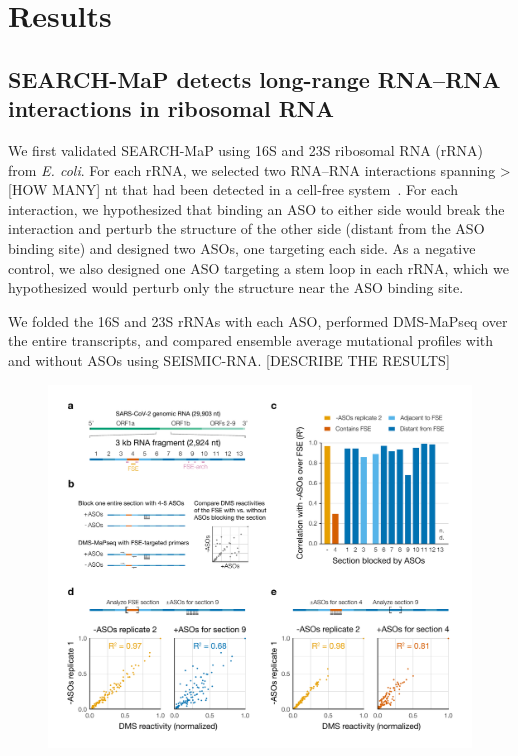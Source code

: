\documentclass[main.tex]{subfiles}
\begin{document}
\section{Results}
\label{results}







\subsection{SEARCH-MaP detects long-range RNA--RNA interactions in ribosomal RNA}

We first validated SEARCH-MaP using 16S and 23S ribosomal RNA (rRNA) from \textit{E. coli}.
For each rRNA, we selected two RNA--RNA interactions spanning > [HOW MANY] nt that had been detected in a cell-free system~\cite{Mustoe2019}.
For each interaction, we hypothesized that binding an ASO to either side would break the interaction and perturb the structure of the other side (distant from the ASO binding site) and designed two ASOs, one targeting each side.
As a negative control, we also designed one ASO targeting a stem loop in each rRNA, which we hypothesized would perturb only the structure near the ASO binding site.

We folded the 16S and 23S rRNAs with each ASO, performed DMS-MaPseq over the entire transcripts, and compared ensemble average mutational profiles with and without ASOs using SEISMIC-RNA.
[DESCRIBE THE RESULTS]

\begin{figure}[H]
	\includegraphics[height=0.95\textheight]{../MainFigures/fig2.pdf}
	\caption{}
	\label{fig2}
\end{figure}
\end{document}
